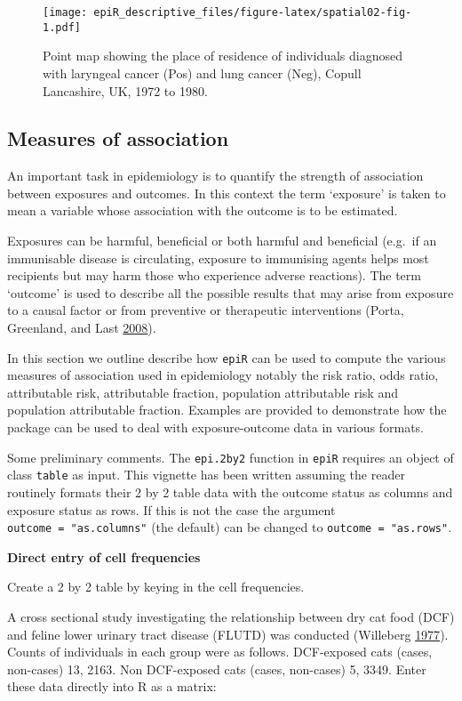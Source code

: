 \documentclass[
]{article}
\begin{document}
\begin{figure}
\centering
\texttt{[image: epiR\_descriptive\_files/figure-latex/spatial02-fig-1.pdf]}
\caption{\label{fig:spatial02}Point map showing the place of residence
of individuals diagnosed with laryngeal cancer (Pos) and lung cancer
(Neg), Copull Lancashire, UK, 1972 to 1980.}
\end{figure}

\hypertarget{measures-of-association}{%
\subsection{Measures of association}\label{measures-of-association}}

An important task in epidemiology is to quantify the strength of
association between exposures and outcomes. In this context the term
`exposure' is taken to mean a variable whose association with the
outcome is to be estimated.

Exposures can be harmful, beneficial or both harmful and beneficial
(e.g.~if an immunisable disease is circulating, exposure to immunising
agents helps most recipients but may harm those who experience adverse
reactions). The term `outcome' is used to describe all the possible
results that may arise from exposure to a causal factor or from
preventive or therapeutic interventions (Porta, Greenland, and Last
\protect\hyperlink{ref-porta_et_al:2008}{2008}).

In this section we outline describe how \texttt{epiR} can be used to
compute the various measures of association used in epidemiology notably
the risk ratio, odds ratio, attributable risk, attributable fraction,
population attributable risk and population attributable fraction.
Examples are provided to demonstrate how the package can be used to deal
with exposure-outcome data in various formats.

Some preliminary comments. The \texttt{epi.2by2} function in
\texttt{epiR} requires an object of class \texttt{table} as input. This
vignette has been written assuming the reader routinely formats their 2
by 2 table data with the outcome status as columns and exposure status
as rows. If this is not the case the argument
\texttt{outcome\ =\ "as.columns"} (the default) can be changed to
\texttt{outcome\ =\ "as.rows"}.

\textbf{Direct entry of cell frequencies}

Create a 2 by 2 table by keying in the cell frequencies.

A cross sectional study investigating the relationship between dry cat
food (DCF) and feline lower urinary tract disease (FLUTD) was conducted
(Willeberg \protect\hyperlink{ref-willeberg:1977}{1977}). Counts of
individuals in each group were as follows. DCF-exposed cats (cases,
non-cases) 13, 2163. Non DCF-exposed cats (cases, non-cases) 5, 3349.
Enter these data directly into R as a matrix:
\end{document}
